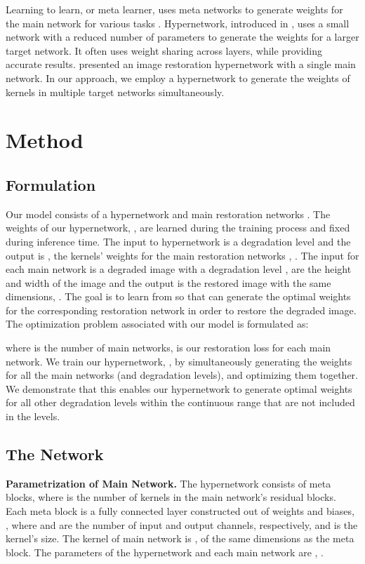 \documentclass{article}
\begin{document}
Learning to learn, or meta learner, uses meta networks to generate weights for the main network for various tasks \cite{liu2020metadistiller}.  Hypernetwork, introduced in \cite{ha2016hypernetworks}, uses a small network with a reduced number of parameters to generate the weights for a larger target network. It often uses weight sharing across layers, while providing accurate results. \cite{fan2018decouple} presented an image restoration hypernetwork with a single main network. In our approach, we employ a hypernetwork to generate the weights of kernels in multiple target networks simultaneously.


\section{Method}

\subsection{Formulation}

Our model consists of a hypernetwork  and main restoration networks . The weights of our hypernetwork, , are learned during the training process and fixed during inference time. The input to hypernetwork  is a degradation level  and the output is , the kernels' weights for the main restoration networks , . The input for each main network  is a degraded image  with a degradation level ,  are the height and width of the image and the output is the restored image with the same dimensions, . The goal is to learn  from  so that  can generate the optimal weights for the corresponding restoration network  in order to restore the degraded image. The optimization problem associated with our model is formulated as:


where  is the number of main networks,  is our restoration loss for each main network. We train our hypernetwork, , by simultaneously generating the weights for all the  main networks (and degradation levels), and optimizing them together. We demonstrate that this enables our hypernetwork to generate optimal weights for all other degradation levels within the continuous range that are not included in the  levels. 




\subsection{The Network}

{\bf Parametrization of Main Network.} The hypernetwork  consists of  meta blocks, where  is the number of kernels in the main network's residual blocks. Each meta block is a fully connected layer constructed out of weights and biases, , where  and  are the number of input and output channels, respectively, and  is the kernel's size. The  kernel of main network  is , of the same dimensions as the meta block. The parameters of the hypernetwork and each main network are , .
\end{document}
